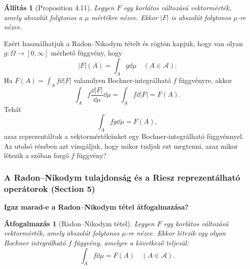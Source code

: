 \documentclass[handout]{beamer} %
\newtheorem{allitas}[lem]{Állítás}
\newtheorem{atfog}[lem]{Átfogalmazás}
\begin{document}
\begin{frame}
\justifying
\begin{allitas}[Proposition 4.11] Legyen $F$ egy korlátos változású vektormérték, amely abszolút folytonos a $\mu$ mértékre nézve. Ekkor $|F|$ is abszolút folytonos $\mu$-re nézve.
\end{allitas}
Ezért használhatjuk a Radon\---Nikodym tételt és rögtön kapjuk, hogy van olyan $g \colon \Omega \to [0,\infty]$ mérhető függvény, hogy
$$|F|(A) = \int_{A} g \dd{\mu} \quad (A \in \mathcal{A}).$$ Ha $F(A) = \int_{A} f \dd{|F|}$ valamilyen Bochner-integrálható $f$ függvényre, akkor
$$\int_{A} f \frac{\dd{|F|}}{\dd{\mu}} \dd{\mu} = \int_{A} f \dd{|F|} = F(A).$$
Tehát 
$$\int_{A} fg \dd{\mu} = F(A),$$
azaz reprezentáltuk a vektormértékünket egy Bochner-integrálható függvénnyel. Az utolsó részben azt vizsgáljuk, hogy mikor tudjuk ezt megtenni, azaz mikor létezik a szóban forgó $f$ függvény?
\end{frame}

\begin{frame}
\frametitle{A Radon\---Nikodym tulajdonság és a Riesz reprezentálható operátorok (Section 5)}
\justifying
\textbf{Igaz marad-e a Radon\---Nikodym tétel átfogalmazása?}
\begin{atfog}[Radon\---Nikodym tétel] Legyen $F$ egy korlátos változású vektormérték, amely abszolút folytonos $\mu$-re nézve. Ekkor létezik egy olyan Bochner integrálható $f$ függvény, amelyre a következő teljesül:
$$\int_{A} f \dd{\mu} = F(A) \quad (A \in \mathcal{A}).$$
\end{atfog}
\end{frame}
\end{document}
